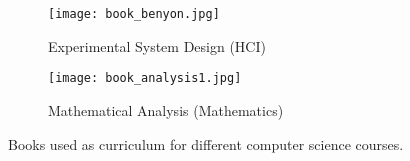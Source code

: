\begin{figure}
  \centering
  \begin{subfigure}{0.48\textwidth}
    \centering
    \texttt{[image: book\_benyon.jpg]}
    \caption{Experimental System Design (HCI)}
    \label{fig:meta_books_hci}
  \end{subfigure}
  \hspace{0.1em}
  \begin{subfigure}{0.48\textwidth}
    \centering
    \texttt{[image: book\_analysis1.jpg]}
    \caption{Mathematical Analysis (Mathematics)}
    \label{fig:meta_books_math}
  \end{subfigure}
  \caption[]{Books used as curriculum for different computer science courses.}
  \label{fig:meta_books}
\end{figure}
